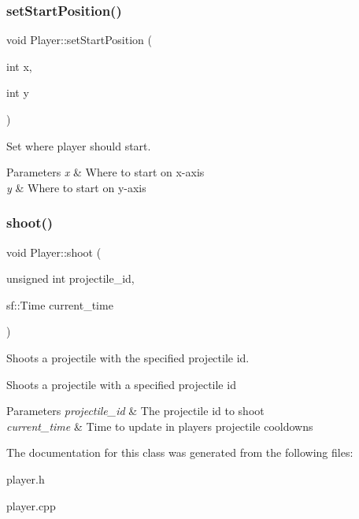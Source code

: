 \subsubsection{\texorpdfstring{set\+Start\+Position()}{setStartPosition()}\hspace{0.1cm}{\footnotesize\ttfamily [2/2]}}
{\footnotesize\ttfamily void Player\+::set\+Start\+Position (\begin{DoxyParamCaption}\item[{int}]{x,  }\item[{int}]{y }\end{DoxyParamCaption})}



Set where player should start. 


\begin{DoxyParams}{Parameters}
{\em x} & Where to start on x-\/axis \\
\hline
{\em y} & Where to start on y-\/axis \\
\hline
\end{DoxyParams}
\mbox{\label{classPlayer_a36adab5b0f1a273290786c75c280d69d}} 
\subsubsection{\texorpdfstring{shoot()}{shoot()}}
{\footnotesize\ttfamily void Player\+::shoot (\begin{DoxyParamCaption}\item[{unsigned int}]{projectile\+\_\+id,  }\item[{sf\+::\+Time}]{current\+\_\+time }\end{DoxyParamCaption})}



Shoots a projectile with the specified projectile id. 

Shoots a projectile with a specified projectile id 
\begin{DoxyParams}{Parameters}
{\em projectile\+\_\+id} & The projectile id to shoot \\
\hline
{\em current\+\_\+time} & Time to update in player\textquotesingle{}s projectile cooldowns \\
\hline
\end{DoxyParams}


The documentation for this class was generated from the following files\+:\begin{DoxyCompactItemize}
\item 
player.\+h\item 
player.\+cpp\end{DoxyCompactItemize}
